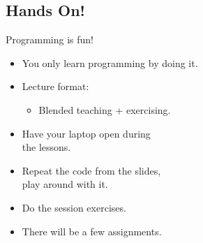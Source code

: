 \documentclass[aspectratio=1610,slidestop]{beamer}
\begin{document}
\subsection{Hands On!}
\begin{pframe}
 Programming is fun!
 \begin{itemize}
  \item You only learn programming by doing it.
  \item Lecture format:
  \begin{itemize}
   \item Blended teaching + exercising.
  \end{itemize}
  \item Have your laptop open during\\
  the lessons.
  \item Repeat the code from the slides,\\
  play around with it.
  \item Do the session exercises.
  \item There will be a few assignments.
 \end{itemize}
\end{pframe}
\end{document}
